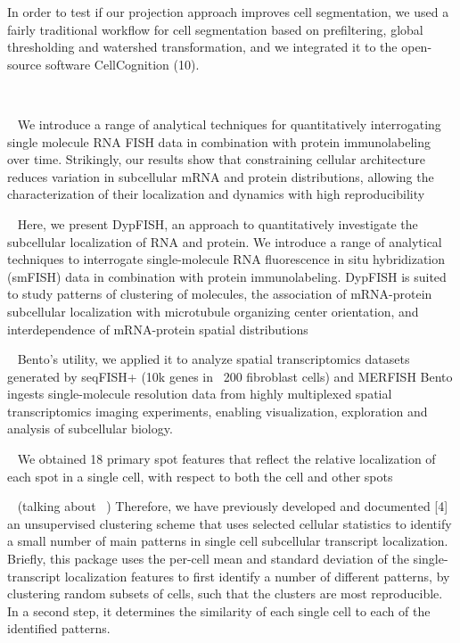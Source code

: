 In order to test if our projection approach improves cell segmentation,
we used a fairly traditional workflow for cell segmentation based on prefiltering,
global thresholding and watershed transformation, and we integrated it to the
open-source software CellCognition (10).

~\cite{samacoits_computational_2018}






~\cite{savulescu_dypfish_2019}
We introduce a range of analytical techniques for quantitatively interrogating
single molecule RNA FISH data in combination with protein immunolabeling over time.
Strikingly, our results show that constraining cellular architecture reduces
variation in subcellular mRNA and protein distributions, allowing the
characterization of their localization and dynamics with high reproducibility

~\cite{savulescu_interrogating_2021}
Here, we present DypFISH, an approach to quantitatively investigate the
subcellular localization of RNA and protein. We introduce a range of analytical
techniques to interrogate single-molecule RNA fluorescence in situ hybridization
(smFISH) data in combination with protein immunolabeling. DypFISH is suited to
study patterns of clustering of molecules, the association of mRNA-protein
subcellular localization with microtubule organizing center orientation, and
interdependence of mRNA-protein spatial distributions


~\cite{mah_bento_2022}
Bento’s utility, we applied it to analyze spatial transcriptomics datasets generated by seqFISH+ (10k genes in ~200 fibroblast cells) and MERFISH
Bento ingests single-molecule resolution data from highly multiplexed
spatial transcriptomics imaging experiments, enabling visualization, exploration and analysis of subcellular
biology.


~\cite{battich_image-based_2013}
We obtained 18 primary spot features that reflect the
relative localization of each spot in a single cell, with respect to both the cell and other spots

~\cite{stoeger_computer_2015}
(talking about ~\cite{battich_image-based_2013})
Therefore, we have previously developed and documented [4] an unsupervised
clustering scheme that uses selected cellular statistics to identify a small
number of main patterns in single cell subcellular transcript localization.
Briefly, this package uses the per-cell mean and standard deviation of the
single-transcript localization features to first identify a number of
different patterns, by clustering random subsets of cells, such that
the clusters are most reproducible. In a second step, it determines the
similarity of each single cell to each of the identified patterns.

